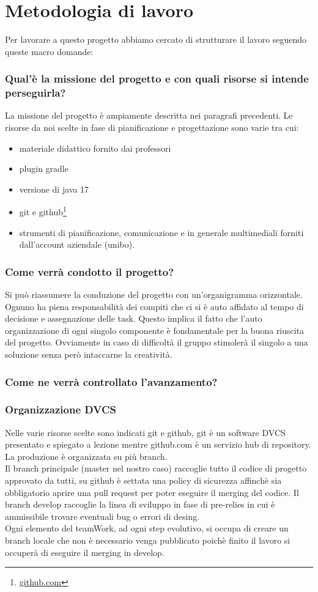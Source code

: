 \documentclass[a4paper,12pt]{report}
\begin{document}
\section{Metodologia di lavoro}
Per lavorare
a questo progetto abbiamo cercato di strutturare il lavoro seguendo queste macro domande:
\subsubsection{Qual'è la missione del progetto e con quali risorse si intende perseguirla?}
La missione del progetto è ampiamente descritta nei paragrafi precedenti.
Le risorse da noi scelte in fase di pianificazione e progettazione sono varie tra cui:
\begin{itemize}
    \item materiale didattico fornito dai professori
    \item plugin gradle
    \item versione di java 17
    \item git e github\footnote{\url{github.com}}
    \item strumenti di pianificazione, comunicazione e in generale multimediali forniti dall'account aziendale (unibo).
\end{itemize}

\subsubsection{Come verrà condotto il progetto?}
Si può riassumere la conduzione del progetto con un'organigramma orizzontale.
Ognuno ha piena responsabilità dei compiti che ci si è auto affidato al tempo di decisione e assegnazione delle task.
Questo implica il fatto che l'auto organizzazione di ogni singolo componente è fondamentale per la buona riuscita del progetto.
Ovviamente in caso di difficoltà il gruppo stimolerà il singolo a una soluzione senza però intaccarne la creatività.
\subsubsection{Come ne verrà controllato l'avanzamento?}
\subsubsection{Organizzazione DVCS}
Nelle varie risorse scelte sono indicati git e github, git è un software DVCS presentato e spiegato a lezione mentre github.com è un servizio
hub di repository.
La produzione è organizzata su più branch.
\\Il branch principale (master nel nostro caso) raccoglie tutto il codice di progetto approvato da tutti, su github è settata una policy
di sicurezza affinchè sia obbligatorio aprire una pull request per poter eseguire il merging del codice.
Il branch develop raccoglie la linea di sviluppo in fase di pre-relies in cui è ammissibile trovare eventuali bug o errori di desing.
\\Ogni elemento del teamWork, ad ogni step evolutivo, si occupa di creare un branch locale che non è necessario venga pubblicato poichè finito
il lavoro si occuperà di eseguire il merging  in develop.
\end{document}
